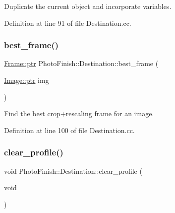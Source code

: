 Duplicate the current object and incorporate variables. 



Definition at line 91 of file Destination.\+cc.

\mbox{\label{class_photo_finish_1_1_destination_a43389654149563e9d50e1eeb85a8301a}} 
\subsubsection{\texorpdfstring{best\+\_\+frame()}{best\_frame()}}
{\footnotesize\ttfamily \hyperlink{class_photo_finish_1_1_frame_aaf5eaa56b8096024c0d45ad9e7f5e6c1}{Frame\+::ptr} Photo\+Finish\+::\+Destination\+::best\+\_\+frame (\begin{DoxyParamCaption}\item[{\hyperlink{class_photo_finish_1_1_image_ab336203305ed3a1397d7245063353b5a}{Image\+::ptr}}]{img }\end{DoxyParamCaption})}



Find the best crop+rescaling frame for an image. 



Definition at line 100 of file Destination.\+cc.

\mbox{\label{class_photo_finish_1_1_destination_a0981df4a77c78a0271c1ee3a7d155a56}} 
\subsubsection{\texorpdfstring{clear\+\_\+profile()}{clear\_profile()}}
{\footnotesize\ttfamily void Photo\+Finish\+::\+Destination\+::clear\+\_\+profile (\begin{DoxyParamCaption}\item[{void}]{ }\end{DoxyParamCaption})\hspace{0.3cm}{\ttfamily [inline]}}



